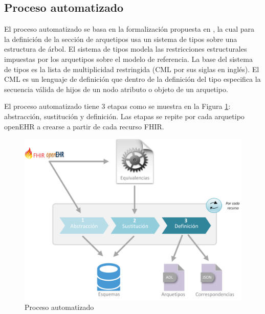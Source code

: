 \subsection{Proceso automatizado}

El proceso automatizado se basa en la formalización propuesta en \cite{Maldonado09}, la cual para la definición de la sección de arquetipos usa un sistema de tipos sobre una estructura de árbol. El sistema de tipos modela las restricciones estructurales impuestas por los arquetipos sobre el modelo de referencia. La base del sistema de tipos es la lista de multiplicidad restringida (CML por sus siglas en inglés). El CML es un lenguaje de definición que dentro de la definición del tipo especifica la secuencia válida de hijos de un nodo atributo o objeto de un arquetipo.

El proceso automatizado tiene 3 etapas como se muestra en la Figura \ref{fig:solution}: abstracción, sustitución y definición. Las etapas se repite por cada arquetipo openEHR a crearse a partir de cada recurso FHIR.

\begin{figure}[h]
  \centering
  \includegraphics[scale=0.5]{./images/solution}
  \caption{Proceso automatizado}
  \label{fig:solution}
\end{figure}






